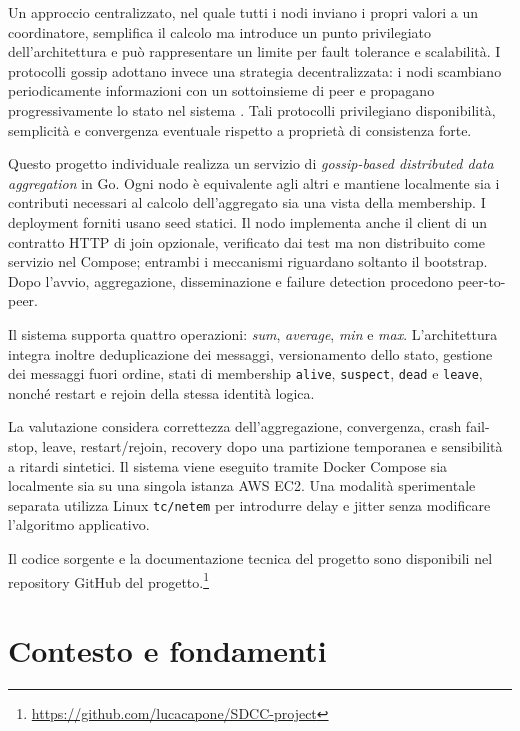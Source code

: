 \documentclass[conference]{IEEEtran}
\begin{document}
Un approccio centralizzato, nel quale tutti i nodi inviano i propri valori a un coordinatore, semplifica il calcolo ma introduce un punto privilegiato dell'architettura e può rappresentare un limite per fault tolerance e scalabilità. I protocolli gossip adottano invece una strategia decentralizzata: i nodi scambiano periodicamente informazioni con un sottoinsieme di peer e propagano progressivamente lo stato nel sistema \cite{demers1987,jelasity2005}. Tali protocolli privilegiano disponibilità, semplicità e convergenza eventuale rispetto a proprietà di consistenza forte.

Questo progetto individuale realizza un servizio di \emph{gossip-based distributed data aggregation} in Go. Ogni nodo è equivalente agli altri e mantiene localmente sia i contributi necessari al calcolo dell'aggregato sia una vista della membership. I deployment forniti usano seed statici. Il nodo implementa anche il client di un contratto HTTP di join opzionale, verificato dai test ma non distribuito come servizio nel Compose; entrambi i meccanismi riguardano soltanto il bootstrap. Dopo l'avvio, aggregazione, disseminazione e failure detection procedono peer-to-peer.

Il sistema supporta quattro operazioni: \emph{sum}, \emph{average}, \emph{min} e \emph{max}. L'architettura integra inoltre deduplicazione dei messaggi, versionamento dello stato, gestione dei messaggi fuori ordine, stati di membership \texttt{alive}, \texttt{suspect}, \texttt{dead} e \texttt{leave}, nonché restart e rejoin della stessa identità logica.

La valutazione considera correttezza dell'aggregazione, convergenza, crash fail-stop, leave, restart/rejoin, recovery dopo una partizione temporanea e sensibilità a ritardi sintetici. Il sistema viene eseguito tramite Docker Compose sia localmente sia su una singola istanza AWS EC2. Una modalità sperimentale separata utilizza Linux \texttt{tc/netem} per introdurre delay e jitter senza modificare l'algoritmo applicativo.

Il codice sorgente e la documentazione tecnica del progetto sono disponibili nel repository GitHub del progetto.\footnote{\url{https://github.com/lucacapone/SDCC-project}}

\section{Contesto e fondamenti}
\end{document}
